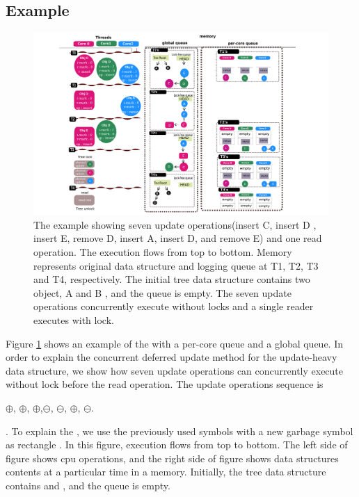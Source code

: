 \subsection{Example}
\begin{figure}[h]
  \begin{center}
     \includegraphics[width=1.0\textwidth,height=0.4\textheight]{fig/basic_gldu}
  \end{center}
  \caption{The \LDU example showing seven update operations(insert C, insert D ,
  insert E, remove D, insert A, insert D, and remove E) and one read
  operation. The execution flows from top to bottom.
  Memory represents original data structure and logging queue at T1, T2, T3 and T4,
  respectively. The initial tree data structure contains two object, A and B , and the queue is empty.
  The seven update operations concurrently execute without locks and a single
  reader executes with lock.}
  \label{fig:basic}
\end{figure}


Figure \ref{fig:basic} shows an example of the \LDU with a per-core queue and
a global queue.
In order to explain the concurrent deferred update method for the update-heavy
data structure, we show how seven update operations can concurrently execute
without lock before the read operation.
The update operations sequence is
\begin{center}
$\oplus$, $\oplus$, $\oplus$,$\ominus$,
$\ominus$, $\oplus$, $\ominus$. 
\end{center}.
To explain the \LDU, we use the previously used symbols with a new garbage symbol as
rectangle .
In this figure, execution flows from top to bottom.
The left side of figure shows cpu operations, and the right side of figure shows data structures
contents at a particular time in a memory.
Initially, the tree data structure contains  and , and 
the queue is empty.

